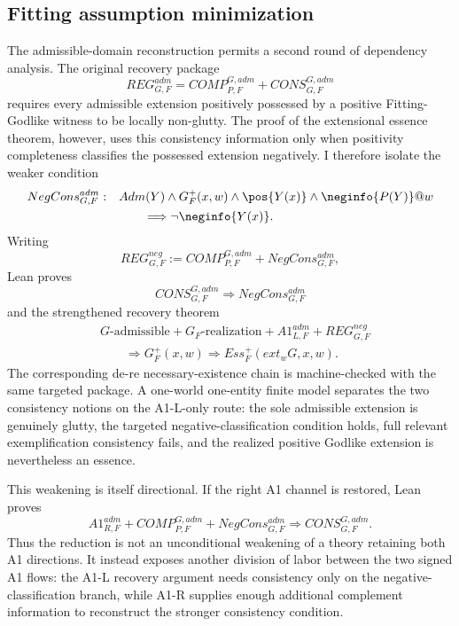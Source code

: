 \subsection{Fitting assumption minimization}
\label{sec:fitting-minimality}

The admissible-domain reconstruction permits a second round of dependency analysis. The original recovery package
\[
  REG_{G,F}^{adm}
  =COMP_{P,F}^{G,adm}+CONS_{G,F}^{G,adm}
\]
requires every admissible extension positively possessed by a positive Fitting-Godlike witness to be locally non-glutty. The proof of the extensional essence theorem, however, uses this consistency information only when positivity completeness classifies the possessed extension negatively. I therefore isolate the weaker condition
\[
\begin{split}
  NegCons_{G,F}^{adm}:\quad
  &Adm(Y)\land G_F^+(x,w)\land \pos{Y(x)}\land \neginfo{P(Y)}@w\\
  &\qquad\Longrightarrow \neg\neginfo{Y(x)}.
\end{split}
\]
Writing
\[
  REG_{G,F}^{neg}
  :=COMP_{P,F}^{G,adm}+NegCons_{G,F}^{adm},
\]
Lean proves
\[
  CONS_{G,F}^{G,adm}\Longrightarrow NegCons_{G,F}^{adm}
\]
and the strengthened recovery theorem
\[
\begin{split}
  &G\text{-admissible}
  +G_F\text{-realization}
  +A1_{L,F}^{adm}
  +REG_{G,F}^{neg}\\
  &\qquad\Longrightarrow
  G_F^+(x,w)\Rightarrow Ess_F^+(ext_wG,x,w).
\end{split}
\]
The corresponding de-re necessary-existence chain is machine-checked with the same targeted package. A one-world one-entity finite model separates the two consistency notions on the A1-L-only route: the sole admissible extension is genuinely glutty, the targeted negative-classification condition holds, full relevant exemplification consistency fails, and the realized positive Godlike extension is nevertheless an essence.

This weakening is itself directional. If the right A1 channel is restored, Lean proves
\[
  A1_{R,F}^{adm}
  +COMP_{P,F}^{G,adm}
  +NegCons_{G,F}^{adm}
  \Longrightarrow
  CONS_{G,F}^{G,adm}.
\]
Thus the reduction is not an unconditional weakening of a theory retaining both A1 directions. It instead exposes another division of labor between the two signed A1 flows: the A1-L recovery argument needs consistency only on the negative-classification branch, while A1-R supplies enough additional complement information to reconstruct the stronger consistency condition.

